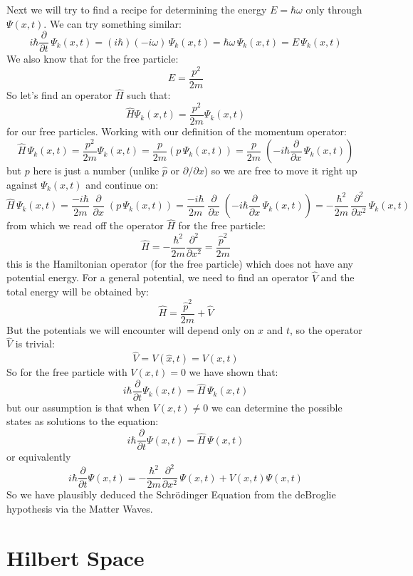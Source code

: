 \documentclass[12pt]{book}
\begin{document}
Next we will try to find a recipe for determining the energy $E=\hbar \omega$ only through $\Psi(x,t)$.  We can try something similar:
$$i\hbar \frac{\partial}{\partial t} \, \Psi_k(x,t) = (i\hbar)(-i\omega) \, \Psi_k(x,t) = \hbar \omega \, \Psi_k(x,t) = E \, \Psi_k(x,t)$$
We also know that for the free particle:
$$E = \frac{p^2}{2m}$$
So let's find an operator $\hat{H}$ such that:
$$\hat{H} \Psi_k(x,t) = \frac{p^2}{2m} \Psi_k(x,t)$$
for our free particles.  Working with our definition of the momentum operator:
$$\hat{H} \, \Psi_k(x,t) = \frac{p^2}{2m} \Psi_k(x,t) = \frac{p}{2m}(p\,\Psi_k(x,t)) = \frac{p}{2m}\;
\left(-i \hbar \frac{\partial}{\partial x}\,\Psi_k(x,t)\right)$$
but $p$ here is just a number (unlike $\hat{p}$ or $\partial/\partial x$) so we are free to move it right up against $\Psi_k(x,t)$ and continue on:
$$\hat{H} \, \Psi_k(x,t) = \frac{-i\hbar}{2m}\;\frac{\partial}{\partial x}\;(p\,\Psi_k(x,t))
= \frac{-i\hbar}{2m}\;\frac{\partial}{\partial x}\;
\left(-i \hbar \frac{\partial}{\partial x}\,\Psi_k(x,t)\right)=-\frac{\hbar^2}{2m}\,\frac{\partial^2}{\partial x^2}\,\Psi_k(x,t)$$
from which we read off the operator $\hat{H}$ for the free particle:
$$\hat{H} = -\frac{\hbar^2}{2m}\frac{\partial^2}{\partial x^2} = \frac{\hat{p}^2}{2m}$$
this is the Hamiltonian operator (for the free particle) which does not have any potential energy.  For a general potential, we need to find an operator $\hat{V}$ and the total energy will be obtained by:
$$\hat{H} = \frac{\hat{p}^2}{2m} + \hat{V}$$
But the potentials we will encounter will depend only on $x$ and $t$, so the operator $\hat{V}$ is trivial:
$$\hat{V} = V(\hat{x},t) = V(x,t)$$
So for the free particle with $V(x,t)=0$ we have shown that:
$$i\hbar \frac{\partial}{\partial t} \Psi_k(x,t) = \hat{H} \, \Psi_k(x,t)$$
but our assumption is that when $V(x,t) \neq 0$ we can determine the possible states as solutions to the equation:
\begin{equation}
i\hbar \frac{\partial}{\partial t} \Psi(x,t) = \hat{H} \, \Psi(x,t)
\end{equation}
or equivalently
\begin{equation}
i\hbar \frac{\partial}{\partial t} \Psi(x,t) = -\frac{\hbar^2}{2m}\frac{\partial^2}{\partial x^2}\, \Psi(x,t) + V(x,t) \Psi(x,t)
\end{equation}
So we have plausibly deduced the Schr\"odinger Equation from the deBroglie hypothesis via the Matter Waves.  

\section{Hilbert Space}
\end{document}
